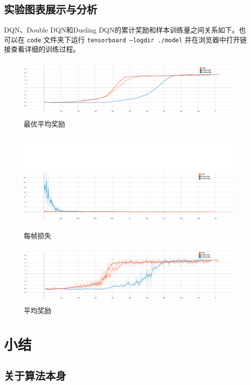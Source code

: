 \documentclass[a4paper,12pt]{article}
\begin{document}
\begin{CJK}{UTF8}{gbsn}
\subsection{实验图表展示与分析}
DQN、Double DQN和Dueling DQN的累计奖励和样本训练量之间关系如下。也可以在 \texttt{code} 文件夹下运行 
\texttt{tensorboard --logdir ./model} 并在浏览器中打开链接查看详细的训练过程。\\
\begin{figure}[h!]
	\centering
	\includegraphics[width=14cm,height=3cm]{./resource/Best 100-episodes average reward.png}
	\caption{最优平均奖励}
\end{figure}
\newpage
\begin{figure}[h!]
	\centering
	\includegraphics[width=14cm,height=5cm]{./resource/Loss per frame.png}
	\caption{每帧损失}
\end{figure}
\begin{figure}[h!]
	\centering
	\includegraphics[width=14cm,height=3cm]{./resource/Reward per episode.png}
	\caption{平均奖励}
\end{figure}

\section{小结}
\subsection{关于算法本身}

\end{CJK}
\end{document}
